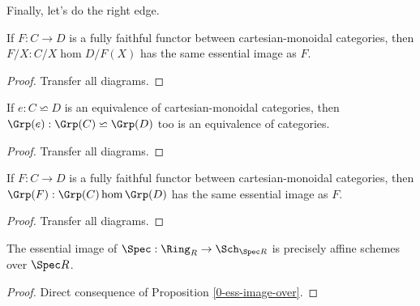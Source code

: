 Finally, let's do the right edge.


\begin{proposition}
  \label{0-ess-image-over}
  \uses{}

  If $F : C \to D$ is a fully faithful functor between cartesian-monoidal categories, then $F / X : C / X \hom D / F(X)$ has the same essential image as $F$.
\end{proposition}
\begin{proof}
  \uses{}

  Transfer all diagrams.
\end{proof}


\begin{proposition}
  \label{0-grp-equiv}
  \uses{}
  \leanok

  If $e : C \backsimeq D$ is an equivalence of cartesian-monoidal categories, then $\Grp(e) : \Grp(C) \backsimeq \Grp(D)$ too is an equivalence of categories.
\end{proposition}
\begin{proof}
  \uses{}
  \leanok

  Transfer all diagrams.
\end{proof}


\begin{proposition}
  \label{0-ess-image-grp}
  \uses{}
  \leanok

  If $F : C \to D$ is a fully faithful functor between cartesian-monoidal categories, then $\Grp(F) : \Grp(C) \hom \Grp(D)$ has the same essential image as $F$.
\end{proposition}
\begin{proof}

  Transfer all diagrams.
\end{proof}


\begin{proposition}
  \label{0-ess-image-spec-alg}
  \leanok

  The essential image of $\Spec : \Ring_R \to \Sch_{\Spec R}$ is precisely affine schemes over $\Spec R$.
\end{proposition}
\begin{proof}

  Direct consequence of Proposition \ref{0-ess-image-over}.
\end{proof}


